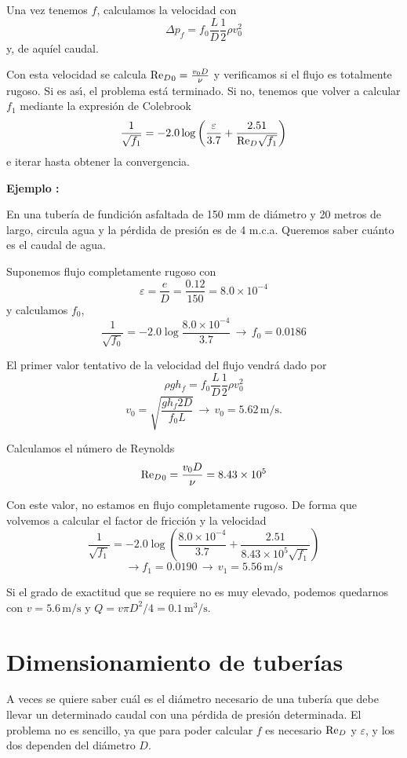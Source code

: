 Una vez tenemos $f$, calculamos la velocidad con
\[
\Delta p_f = f_0 \frac{L}{D} \frac{1}{2}\rho v_0^2
\]
y, de aquíel caudal.

Con esta velocidad se calcula ${\text{Re}_D}_0 = \frac{v_0 D}{\nu}$ y verificamos si el flujo es totalmente rugoso. Si es as\'{\i}, el problema está terminado. Si no, tenemos que volver a calcular $f_1$ mediante la expresión de Colebrook
\[
\frac{1}{\sqrt{f_1}} = -2.0 \log \left(\frac{\varepsilon}{3.7} + \frac{2.51}{\text{Re}_D \sqrt{f_1}}\right)
\]
e iterar hasta obtener la convergencia.

\textbf{Ejemplo : }

En una tubería de fundición asfaltada de 150 mm  de diámetro y 20 metros de largo, circula agua y la pérdida de presión es de 4 m.c.a. Queremos saber cuánto es el caudal de agua.

Suponemos flujo completamente rugoso con
\[\varepsilon = \frac{e}{D} = \frac{0.12}{150} = 8.0\times10^{-4}\]
y calculamos $f_0$,
\[
\frac{1}{\sqrt{f_0}} = -2.0 \log \frac{8.0\times10^{-4}}{3.7} \, \rightarrow \, f_0 = 0.0186
\]

El primer valor tentativo de la velocidad del flujo vendrá dado por
\[
\rho g h_f = f_0 \frac{L}{D}\frac{1}{2}\rho v_0^2
\]
\[
v_0 = \sqrt{\frac{g h_f 2 D}{f_0 L}} \, \rightarrow \, v_0 = 5.62 \, \text{m/s}.
\]

Calculamos el número de Reynolds
\[
{\text{Re}_D}_0 = \frac{v_0 D}{\nu}= 8.43\times 10^5
\]

Con este valor, no estamos en flujo completamente rugoso. De forma que volvemos a calcular el factor de fricción y la velocidad
\[
\frac{1}{\sqrt{f_1}} = -2.0 \log \left(\frac{8.0\times10^{-4}}{3.7}+\frac{2.51}{8.43\times 10^5\sqrt{f_1}}\right)
\]
\[
\rightarrow f_1 = 0.0190 \,\rightarrow \, v_1 = 5.56 \, \text{m/s}
\]

Si el grado de exactitud que se requiere no es muy elevado, podemos quedarnos con $v=5.6\,\text{m/s}$ y $Q=v\pi D^2/4 = 0.1 \, \text{m}^3/\text{s}$.

\section{Dimensionamiento de tuberías}

A veces se quiere saber cuál es el diámetro necesario de una tubería que debe llevar un determinado caudal con una pérdida de presión determinada. El problema no es sencillo, ya que para poder calcular $f$ es necesario $\text{Re}_D$ y $\varepsilon$, y los dos dependen del diámetro $D$.

